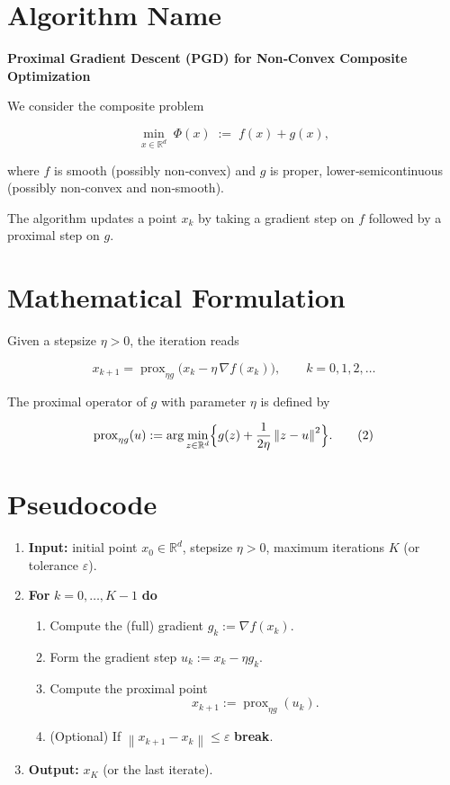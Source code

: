 \documentclass{article}
\newcommand{\prox}{\operatorname{prox}}
\newcommand{\grad}{\nabla}
\newcommand{\R}{\mathbb{R}}
\newcommand{\norm}[1]{\left\|#1\right\|}
\begin{document}
\section*{Algorithm Name}
\textbf{Proximal Gradient Descent (PGD) for Non‑Convex Composite Optimization}  

We consider the composite problem  

\[
\min_{x\in\R^{d}} \; \Phi(x)\;:=\; f(x)+g(x),
\]

where $f$ is smooth (possibly non‑convex) and $g$ is proper, lower‑semicontinuous (possibly non‑convex and non‑smooth).  

The algorithm updates a point $x_k$ by taking a gradient step on $f$ followed by a proximal step on $g$.

\section*{Mathematical Formulation}
Given a stepsize $\eta>0$, the iteration reads  

\[
\boxed{
x_{k+1}= \prox_{\eta g}\bigl(x_k-\eta \,\grad f(x_k)\bigr)},
\qquad k=0,1,2,\dots
\tag{1}
\]

The proximal operator of $g$ with parameter $\eta$ is defined by  

\[
\prox_{\eta g}(u):=\arg\min_{z\in\R^{d}}\Bigl\{ g(z)+\frac{1}{2\eta}\norm{z-u}^{2}\Bigr\}.
\tag{2}
\]

\section*{Pseudocode}
\begin{enumerate}[label=Step~\arabic*:, leftmargin=*]
\item \textbf{Input:} initial point $x_0\in\R^{d}$, stepsize $\eta>0$, maximum iterations $K$ (or tolerance $\varepsilon$).
\item \textbf{For} $k=0,\dots,K-1$ \textbf{do}
\begin{enumerate}[label=\arabic*.]
\item Compute the (full) gradient $g_k:=\grad f(x_k)$.
\item Form the gradient step $u_k:=x_k-\eta g_k$.
\item Compute the proximal point 
\[
x_{k+1}:= \prox_{\eta g}(u_k).
\]
\item (Optional) If $\norm{x_{k+1}-x_k}\le \varepsilon$ \textbf{break}.
\end{enumerate}
\item \textbf{Output:} $x_{K}$ (or the last iterate).
\end{enumerate}
\end{document}
